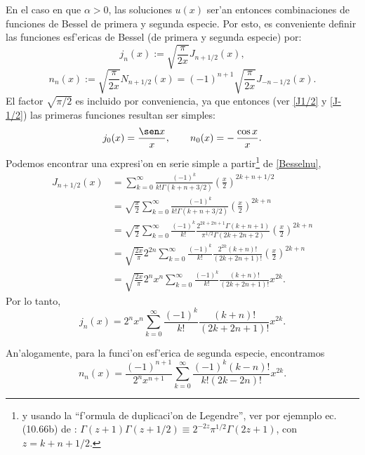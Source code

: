 En el caso en que $\alpha>0$, las soluciones $u(x)$ ser'an entonces combinaciones de funciones de Bessel de primera y segunda especie. Por esto, es conveniente definir las funciones esf'ericas de Bessel (de primera y segunda especie) por:
\begin{equation}
j_{n}(x) := \sqrt{\frac{\pi}{2x}} J_{n+1/2}(x),
\end{equation}
\begin{equation}
n_{n}(x) := \sqrt{\frac{\pi}{2x}} N_{n+1/2}(x) = (-1)^{n+1} \sqrt{\frac{\pi}{2x}} J_{-n-1/2}(x).
\end{equation}
El factor $\sqrt{\pi/2}$ es incluido por conveniencia, ya que entonces (ver \eqref{J1/2} y \eqref{J-1/2}) las primeras funciones resultan ser simples:
\begin{equation}\label{j0n0}
j_0(x) = \frac{\sen x}{x}, \qquad n_0(x)=-\,\frac{\cos x} {x}.
\end{equation}
Podemos encontrar una expresi'on en serie simple a partir\footnote{y usando la ``f'ormula de duplicaci'on de Legendre'', ver por ejemnplo ec. (10.66b) de \cite{Arfken}: $\Gamma(z+1)\Gamma(z+1/2)\equiv 2^{-2z}\pi^{1/2}\Gamma(2z+1)$, con $z=k+n+1/2$.} de \eqref{Besselnu},
\begin{align}
J_{n+1/2} (x)&= \sum_{k = 0}^\infty \frac{ (-1)^k }{ k! \Gamma(k + n + 3/2) }
\left( \frac{x}{2} \right)^{2k+n+1/2} \\
&=\sqrt{\frac{x}{2}} \sum_{k=0}^\infty \frac{ (-1)^k }{ k! \Gamma(k + n + 3/2) }
\left( \frac{x}{2} \right)^{2k+n} \\
&=\sqrt{\frac{x}{2}} \sum_{k=0}^\infty \frac{ (-1)^k }{ k!}\frac{2^{2k+2n+1}\Gamma(k+n+1)}{\pi^{1/2}\Gamma(2k+2n+2)}
\left( \frac{x}{2} \right)^{2k+n} \\
&=\sqrt{\frac{2x}{\pi}} 2^{2n}\sum_{k=0}^\infty \frac{(-1)^k }{k!}\frac{2^{2k}(k+n)!}{(2k+2n+1)!}\left(\frac{x}{2}\right)^{2k+n} \\
&=\sqrt{\frac{2x}{\pi}} 2^n x^n\sum_{k=0}^\infty \frac{(-1)^k}{k!}\frac{(k+n)!}{(2k+2n+1)!}x^{2k} .
\end{align}
Por lo tanto,
\begin{equation}
\boxed{j_n(x)=2^n x^n\sum_{k=0}^\infty \frac{(-1)^k}{k!}\frac{(k+n)!}{(2k+2n+1)!}x^{2k} .}
\end{equation}

An'alogamente, para la funci'on esf'erica de segunda especie, encontramos
\begin{equation}
\boxed{n_n(x)=\frac{(-1)^{n+1}}{2^nx^{n+1}}\sum_{k=0}^\infty \frac{(-1)^k(k-n)!}{k!(2k-2n)!}x^{2k} .}
\end{equation}

